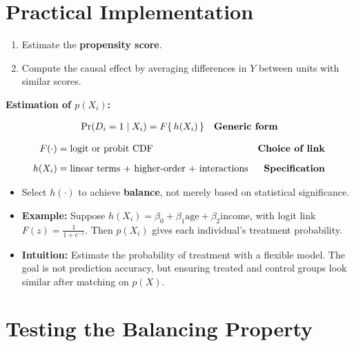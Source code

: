 \documentclass[12pt]{article}
\begin{document}
\section*{\noindent\textbf{Practical Implementation}}

\begin{enumerate}
    \item Estimate the \textbf{propensity score}.
    \item Compute the causal effect by averaging differences in $Y$ between units with similar scores.
\end{enumerate}

\textbf{Estimation of $p(X_i)$:}

\singlespacing
\begin{align}
\Pr(D_i=1 \mid X_i) 
   &= F\{\,h(X_i)\,\} 
   & \text{\textbf{Generic form}}
\end{align}

\singlespacing
\begin{align}
F(\cdot) &= \text{logit or probit CDF} 
   & \text{\textbf{Choice of link}} \\[6pt]
h(X_i) &= \text{linear terms + higher-order + interactions} 
   & \text{\textbf{Specification}}
\end{align}

\begin{itemize}
    \item Select $h(\cdot)$ to achieve \textbf{balance}, not merely based on statistical significance.
\end{itemize}

\begin{itemize}
    \item \textbf{Example:} Suppose $h(X_i) = \beta_0 + \beta_1 \text{age} + \beta_2 \text{income}$, with logit link $F(z)=\frac{1}{1+e^{-z}}$. Then $p(X_i)$ gives each individual’s treatment probability.
    \item \textbf{Intuition:} Estimate the probability of treatment with a flexible model. The goal is not prediction accuracy, but ensuring treated and control groups look similar after matching on $p(X)$.  
\end{itemize}

\section*{\noindent\textbf{Testing the Balancing Property}}
\end{document}
